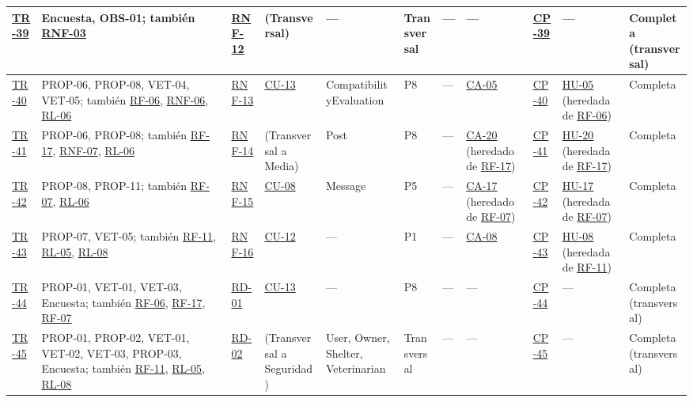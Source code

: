 \documentclass[journal,onecolumn]{IEEEtran}
\begin{document}
\begin{landscape}
\begin{longtable}{@{}p{0.8cm} p{4.0cm} p{1.3cm} p{1.7cm} p{2.5cm} p{1.0cm} p{1.9cm} p{0.9cm} p{0.9cm} p{1.75cm} p{2.2cm}@{}}
			\hyperref[tr:39]{TR-39}\label{tr:39} & Encuesta, OBS-01; también \hyperref[tab:RNF-03]{RNF-03} & \hyperref[tab:RNF-12]{RNF-12} & (Transversal) & --- & Transversal & --- & --- & \hyperref[cp:39]{CP-39} & --- & Completa (transversal) \\ \midrule
			\hyperref[tr:40]{TR-40}\label{tr:40} & PROP-06, PROP-08, VET-04, VET-05; también \hyperref[tab:RF-06]{RF-06}, \hyperref[tab:RNF-06]{RNF-06}, \hyperref[rl:06]{RL-06} & \hyperref[tab:RNF-13]{RNF-13} & \hyperref[tab:CU-13]{CU-13} & CompatibilityEvaluation & P8 & --- & \hyperref[lst:ca05]{CA-05} & \hyperref[cp:40]{CP-40} & \hyperref[tab:HU-05]{HU-05} (heredada de \hyperref[tab:RF-06]{RF-06}) & Completa \\ \midrule
			\hyperref[tr:41]{TR-41}\label{tr:41} & PROP-06, PROP-08; también \hyperref[tab:RF-17]{RF-17}, \hyperref[tab:RNF-07]{RNF-07}, \hyperref[rl:06]{RL-06} & \hyperref[tab:RNF-14]{RNF-14} & (Transversal a Media) & Post & P8 & --- & \hyperref[lst:ca20]{CA-20} (heredado de \hyperref[tab:RF-17]{RF-17}) & \hyperref[cp:41]{CP-41} & \hyperref[tab:HU-20]{HU-20} (heredada de \hyperref[tab:RF-17]{RF-17}) & Completa \\ \midrule
			\hyperref[tr:42]{TR-42}\label{tr:42} & PROP-08, PROP-11; también \hyperref[tab:RF-07]{RF-07}, \hyperref[rl:06]{RL-06} & \hyperref[tab:RNF-15]{RNF-15} & \hyperref[tab:CU-08]{CU-08} & Message & P5 & --- & \hyperref[lst:ca17]{CA-17} (heredado de \hyperref[tab:RF-07]{RF-07}) & \hyperref[cp:42]{CP-42} & \hyperref[tab:HU-17]{HU-17} (heredada de \hyperref[tab:RF-07]{RF-07}) & Completa \\ \midrule
			\hyperref[tr:43]{TR-43}\label{tr:43} & PROP-07, VET-05; también \hyperref[tab:RF-11]{RF-11}, \hyperref[rl:05]{RL-05}, \hyperref[rl:08]{RL-08} & \hyperref[tab:RNF-16]{RNF-16} & \hyperref[tab:CU-12]{CU-12} & --- & P1 & --- & \hyperref[lst:ca08]{CA-08} & \hyperref[cp:43]{CP-43} & \hyperref[tab:HU-08]{HU-08} (heredada de \hyperref[tab:RF-11]{RF-11}) & Completa \\ \midrule
			\hyperref[tr:44]{TR-44}\label{tr:44} & PROP-01, VET-01, VET-03, Encuesta; también \hyperref[tab:RF-06]{RF-06}, \hyperref[tab:RF-17]{RF-17}, \hyperref[tab:RF-07]{RF-07} & \hyperref[tab:RD-01]{RD-01} & \hyperref[tab:CU-13]{CU-13} & --- & P8 & --- & --- & \hyperref[cp:44]{CP-44} & --- & Completa (transversal) \\ \midrule
			\hyperref[tr:45]{TR-45}\label{tr:45} & PROP-01, PROP-02, VET-01, VET-02, VET-03, PROP-03, Encuesta; también \hyperref[tab:RF-11]{RF-11}, \hyperref[rl:05]{RL-05}, \hyperref[rl:08]{RL-08} & \hyperref[tab:RD-02]{RD-02} & (Transversal a Seguridad) & User, Owner, Shelter, Veterinarian & Transversal & --- & --- & \hyperref[cp:45]{CP-45} & --- & Completa (transversal) \\ \midrule

\end{longtable}
\end{landscape}
\end{document}

